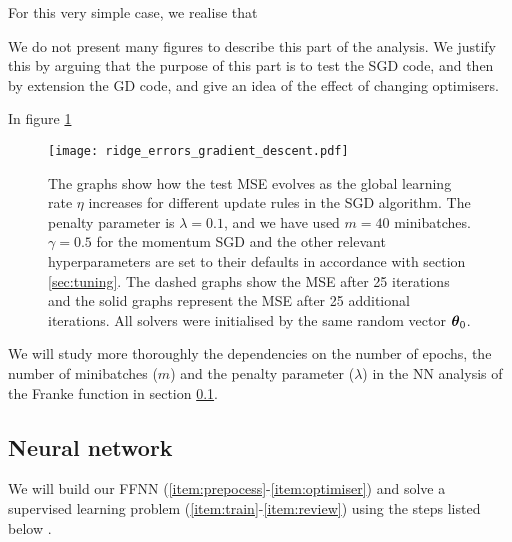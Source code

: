     For this very simple case, we realise that 

    We do not present many figures to describe this part of the analysis. We justify this by arguing that the purpose of this part is to test the SGD code, and then by extension the GD code, and give an idea of the effect of changing optimisers. 

    In figure \ref{fig:simple_reg_errors_ridge}  \fillertext

    \begin{figure}
        \texttt{[image: ridge\_errors\_gradient\_descent.pdf]}
        \caption{The graphs show how the test MSE evolves as the global learning rate $\eta$ increases for different update rules in the SGD algorithm. The penalty parameter is $\lambda=0.1$, and we have used $m=40$ minibatches. $\gamma=0.5$ for the momentum SGD and the other relevant hyperparameters are set to their defaults in accordance with section \ref{sec:tuning}. The dashed graphs show the MSE after 25 iterations and the solid graphs represent the MSE after 25 additional iterations. All solvers were initialised by the same random vector $\boldsymbol{\theta}_0$.}
        \label{fig:simple_reg_errors_ridge}
    \end{figure}

    We will study more thoroughly the dependencies on the number of epochs, the number of minibatches ($m$) and the penalty parameter ($\lambda$) in the NN analysis of the Franke function in section \ref{sec:analysis_NN}. 




    
\subsection{Neural network}\label{sec:analysis_NN}
    We will build our FFNN (\ref{item:prepocess}-\ref{item:optimiser}) and solve a supervised learning problem (\ref{item:train}-\ref{item:review}) using the steps listed below \citep{mhjensen}.


